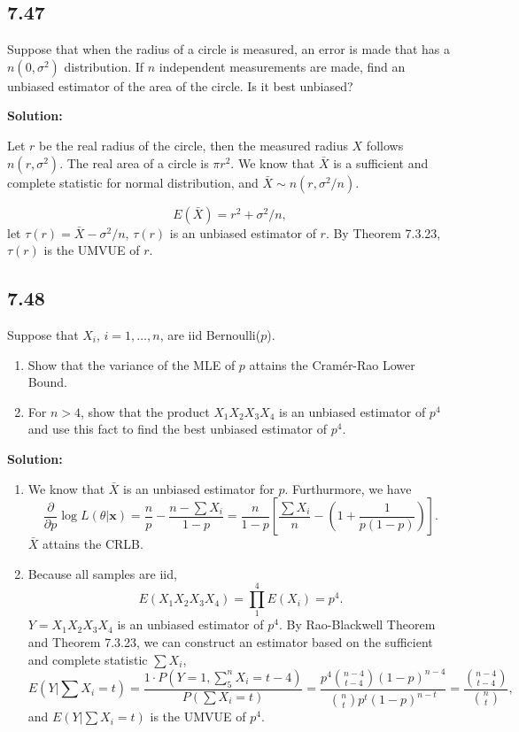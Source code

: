 \documentclass[11pt]{article}
\newcommand{\x}{\mathbf{x}}
\newcommand{\Sol}{\par {\bf Solution:}}
\newcommand{\Partial}[1]{\frac{\partial}{\partial #1}}
\begin{document}
\subsection*{7.47}
Suppose that when the radius of a circle is measured, an error is made that has a $n(0, \sigma^2)$ distribution. If $n$ independent measurements are made, find an unbiased estimator of the area of the circle. Is it best unbiased?
\Sol

Let $r$ be the real radius of the circle, then the measured radius $X$ follows $n(r, \sigma^2)$. The real area of a circle is $\pi r^2$.
We know that $\bar X$ is a sufficient and  complete statistic for normal distribution, and $\bar X \sim n(r, \sigma^2/n)$.

\[
E(\bar X) = r^2 + \sigma^2/n,
\]
let $\tau(r) = \bar X - \sigma^2/n$, $\tau(r)$ is an unbiased estimator of $r$. By Theorem 7.3.23, $\tau(r)$ is the UMVUE of $r$.

\subsection*{7.48}
Suppose that $X_i$, $i = 1, \dots, n$, are iid Bernoulli($p$).
\begin{enumerate}[label=(\alph*)]
    \item Show that the variance of the MLE of $p$ attains the Cram\'{e}r-Rao Lower Bound.
    \item For $n > 4$, show that the product $X_1X_2X_3X_4$ is an unbiased estimator of $p^4$ and use this fact to find the best unbiased estimator of $p^4$.
\end{enumerate}

\Sol
\begin{enumerate}[label=(\alph*)]
    \item
    We know that $\bar X$ is an unbiased estimator for $p$. Furthurmore, we have
    \[
    \Partial p \log L(\theta|\x) = \frac{n}{p}-\frac{n-\sum X_i}{1-p} = \frac{n}{1-p}[\frac{\sum X_i}{n} - (1 + \frac{1}{p(1-p)})].
    \]
    $\bar X$ attains the CRLB.
    \item
    Because all samples are iid,
    \[
    E(X_1X_2X_3X_4) = \prod_1^4E(X_i) = p^4.
    \]
    $Y = X_1X_2X_3X_4$ is an unbiased estimator of $p^4$.
    By Rao-Blackwell Theorem and Theorem 7.3.23, we can construct an estimator based on the sufficient and complete statistic $\sum X_i$,
    \[
    E(Y|\sum X_i = t) = \frac{1 \cdot P(Y = 1, \sum_5^n X_i = t -4)}{P(\sum X_i = t)} = \frac{p^4{n-4 \choose t-4}(1-p)^{n-4}}{{n \choose t} p^t(1-p)^{n-t}} = \frac{{n-4 \choose  t-4}}{{n \choose t}},
    \]
    and $E(Y|\sum X_i = t)$ is the UMVUE of $p^4$.
\end{enumerate}
\end{document}
